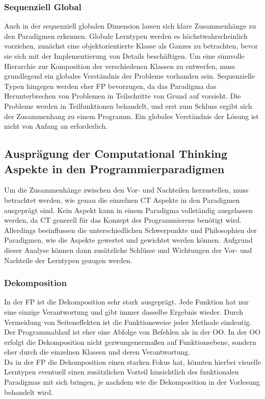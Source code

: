 \subsubsection{Sequenziell Global}
Auch in der sequenziell globalen Dimension lassen sich klare Zusammenhänge zu den Paradigmen erkennen. Globale Lerntypen werden es höchstwahrscheinlich vorziehen, zunächst eine objektorientierte Klasse als Ganzes zu betrachten, bevor sie sich mit der Implementierung von Details beschäftigen. Um eine sinnvolle Hierarchie zur Komposition der verschiedenen Klassen zu entwerfen, muss grundlegend ein globales Verständnis der Probleme vorhanden sein.
Sequenzielle Typen hingegen werden eher FP bevorzugen, da das Paradigma das Herunterbrechen von Problemen in Teilschritte von Grund auf vorsieht. Die Probleme werden in Teilfunktionen behandelt, und erst zum Schluss ergibt sich der Zusammenhang zu einem Programm. Ein globales Verständnis der Lösung ist nicht von Anfang an erforderlich.

\subsection{Ausprägung der Computational Thinking Aspekte in den Programmierparadigmen}
Um die Zusammenhänge zwischen den Vor- und Nachteilen herzustellen, muss betrachtet werden, wie genau die einzelnen CT Aspekte in den Paradigmen ausgeprägt sind. Kein Aspekt kann in einem Paradigma vollständig ausgelassen werden, da CT generell für das Konzept des Programmierens benötigt wird. Allerdings beeinflussen die unterschiedlichen Schwerpunkte und Philosophien der Paradigmen, wie die Aspekte gewertet und gewichtet werden können.
Aufgrund dieser Analyse können dann zusätzliche Schlüsse und Wichtungen der Vor- und Nachteile der Lerntypen gezogen werden.

\subsubsection{Dekomposition}
In der FP ist die Dekomposition sehr stark ausgeprägt. Jede Funktion hat nur eine einzige Verantwortung und gibt immer dasselbe Ergebnis wieder. Durch Vermeidung von Seiteneffekten ist die Funktionsweise jeder Methode eindeutig. Der Programmablauf ist eher eine Abfolge von Befehlen als in der OO. In der OO erfolgt die Dekomposition nicht gezwungenermaßen auf Funktionsebene, sondern eher durch die einzelnen Klassen und deren Verantwortung.
\\
Da in der FP die Dekomposition einen starken Fokus hat, könnten hierbei visuelle Lerntypen eventuell einen zusätzlichen Vorteil hinsichtlich des funktionalen Paradigmas mit sich bringen, je nachdem wie die Dekomposition in der Vorlesung behandelt wird.

